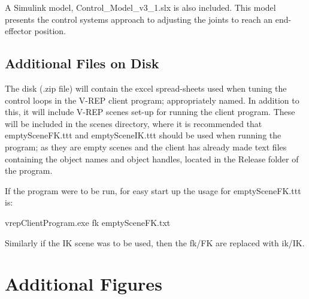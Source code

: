 \documentclass[12pt,openany,a4paper]{book}
\begin{document}
{A Simulink model, Control\_Model\_v3\_1.slx is also included. This model presents the control systems approach to adjusting the joints to reach an end-effector position.

\section{Additional Files on Disk}

The disk (.zip file) will contain the excel spread-sheets used when tuning the control loops in the V-REP client program; appropriately named. In addition to this, it will include V-REP scenes set-up for running the client program. These will be included in the scenes directory, where it is recommended that emptySceneFK.ttt and emptySceneIK.ttt should be used when running the program; as they are empty scenes and the client has already made text files containing the object names and object handles, located in the Release folder of the program.

If the program were to be run, for easy start up the usage for emptySceneFK.ttt is:

vrepClientProgram.exe fk emptySceneFK.txt

Similarly if the IK scene was to be used, then the fk/FK are replaced with ik/IK.

%
%

\cleardoublepage


%

{}

%

\clearpage

\chapter{Additional Figures}
\begin{center}
\begin{table}[htb]


\end{table}
\end{center}}
\end{document}
